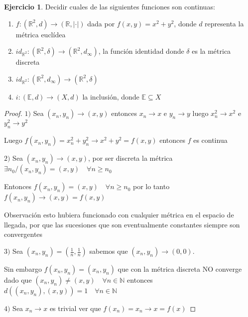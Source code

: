 \documentclass[12pt]{article}
\newcommand{\R}{\mathbb{R}}
\newcommand{\E}{\mathbb{E}}
\newcommand{\N}{\mathbb{N}}
\newcommand{\ra}{\rightarrow}
\theoremstyle{definition}
\newtheorem{ej}{Ejercicio}
\begin{document}
\begin{ej}
  Decidir cuales de las siguientes funciones son continuas:
  \begin{enumerate}
    \item $f:(\R^2,d) \ra (\R, |\cdot|)$ dada por $f(x,y) = x^2 + y^2$, donde $d$ representa la métrica euclídea
    \item $id_{\R^2}:(\R^2,\delta) \ra (\R^2,d_{\infty})$, la función identidad donde $\delta$ es la métrica discreta
    \item $id_{\R^2}: (\R^2,d_{\infty}) \ra (\R^2,\delta)$
    \item $i:(\E,d) \ra (X,d)$ la inclusión, donde $\E \subseteq X$
  \end{enumerate}
  \begin{proof}
  $1)$ Sea $(x_n,y_n) \ra (x,y)$ entonces $x_n \ra x$ e $y_n \ra y$ luego $x_n^2 \ra x^2$ e $y_n^2 \ra y^2$ 


  Luego $f(x_n,y_n) = x_n^2 + y_n^2 \ra x^2 + y ^2 = f(x,y)$ entonces $f$ es continua

$2)$ Sea $(x_n,y_n) \ra (x,y)$, por ser discreta la métrica $\exists n_0 / (x_n,y_n) = (x,y) \quad \forall n \geq n_0$

Entonces $f(x_n,y_n) = (x,y) \quad \forall n \geq n_0$ por lo tanto $f(x_n,y_n) \ra (x,y) = f(x,y)$

Observación esto hubiera funcionado con cualquier métrica en el espacio de llegada, por que las sucesiones que son eventualmente constantes siempre son convergentes

$3)$ Sea $(x_n,y_n) = (\frac{1}{n},\frac{1}{n})$ sabemos que $(x_n,y_n) \ra (0,0)$.

Sin embargo $f(x_n,y_n) = (x_n,y_n)$ que con la métrica discreta NO converge dado que $(x_n,y_n) \neq (x,y) \quad \forall n \in \N$ entonces $d((x_n,y_n),(x,y)) = 1 \quad \forall n \in \N$

$4)$ Sea $x_n \ra x $ es trivial ver que $f(x_n) = x_n \ra x = f(x)$
  \end{proof}
\end{ej}
\newpage
\end{document}
